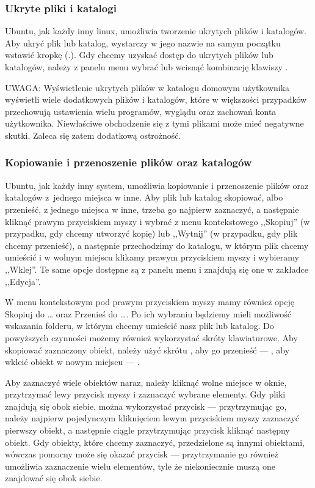\subsubsection{Ukryte pliki i katalogi}
Ubuntu, jak każdy inny linux, umożliwia tworzenie ukrytych plików i katalogów. Aby ukryć plik lub katalog, wystarczy w jego nazwie na samym początku wstawić kropkę (.). Gdy chcemy uzyskać dostęp do ukrytych plików lub katalogów, należy z panelu menu wybrać  lub wcisnąć kombinację klawiszy .

UWAGA: Wyświetlenie ukrytych plików w katalogu domowym użytkownika wyświetli wiele dodatkowych plików i katalogów, które w większości przypadków przechowują ustawienia wielu programów, wyglądu oraz zachowań konta użytkownika. Niewłaściwe obchodzenie się z tymi plikami może mieć negatywne skutki. Zaleca się zatem dodatkową ostrożność.

\subsubsection{Kopiowanie i przenoszenie plików oraz katalogów}
Ubuntu, jak każdy inny system, umożliwia kopiowanie i przenoszenie plików oraz katalogów z~jednego miejsca w inne. Aby plik lub katalog skopiować, albo przenieść, z jednego miejsca w inne, trzeba go najpierw zaznaczyć, a następnie kliknąć prawym przyciskiem myszy i wybrać z menu kontekstowego ,,Skopiuj'' (w przypadku, gdy chcemy utworzyć kopię) lub ,,Wytnij'' (w przypadku, gdy plik chcemy przenieść), a następnie przechodzimy do katalogu, w którym plik chcemy umieścić i w wolnym miejscu klikamy prawym przyciskiem myszy i wybieramy ,,Wklej''. Te same opcje dostępne są z panelu menu i znajdują się one w zakładce ,,Edycja''.

W menu kontekstowym pod prawym przyciskiem myszy mamy również opcję \textcolor{ubuntu_orange}{Skopiuj do \ldots} oraz \textcolor{ubuntu_orange}{Przenieś do \ldots}. Po ich wybraniu będziemy mieli możliwość wskazania folderu, w którym chcemy umieścić nasz plik lub katalog.
Do powyższych czynności możemy również wykorzystać skróty klawiaturowe. Aby skopiować zaznaczony obiekt, należy użyć skrótu , aby go przenieść --- , aby wkleić obiekt w nowym miejscu --- .

Aby zaznaczyć wiele obiektów naraz, należy kliknąć wolne miejsce w oknie, przytrzymać lewy przycisk myszy i zaznaczyć wybrane elementy. Gdy pliki znajdują się obok siebie, można wykorzystać przycisk  --- przytrzymując go, należy najpierw pojedynczym kliknięciem lewym przyciskiem myszy zaznaczyć pierwszy obiekt, a następnie ciągle przytrzymując przycisk  kliknąć następny obiekt. Gdy obiekty, które chcemy zaznaczyć, przedzielone są innymi obiektami, wówczas pomocny może się okazać przycisk  --- przytrzymanie go również umożliwia zaznaczenie wielu elementów, tyle że niekoniecznie muszą one znajdować się obok siebie.

